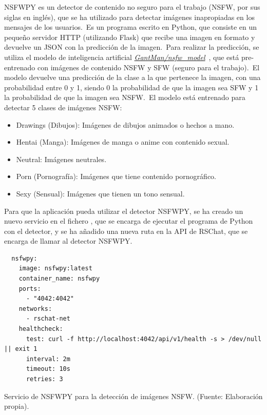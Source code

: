 NSFWPY es un detector de contenido no seguro para el trabajo (NSFW, por sus siglas en inglés), que se ha utilizado para
detectar imágenes inapropiadas en los mensajes de los usuarios.\ Es un programa escrito en Python, que consiste en
un pequeño servidor HTTP (utilizando Flask) que recibe una imagen en formato  y devuelve un JSON con
la predicción de la imagen.\ Para realizar la predicción, se utiliza el modelo de inteligencia artificial
\href{https://github.com/GantMan/nsfw_model}{\textit{GantMan/nsfw\_model}}~\cite{nsfw-model-repo},
que está pre-entrenado con imágenes de contenido NSFW y SFW (seguro para el trabajo).\ El modelo devuelve una
predicción de la clase a la que pertenece la imagen, con una probabilidad entre 0 y 1, siendo 0 la probabilidad de
que la imagen sea SFW y 1 la probabilidad de que la imagen sea NSFW\@.\ El modelo está entrenado para detectar 5
clases de imágenes NSFW:
\begin{itemize}
	\item Drawings (Dibujos): Imágenes de dibujos animados o hechos a mano.
	\item Hentai (Manga): Imágenes de manga o anime con contenido sexual.
	\item Neutral: Imágenes neutrales.
	\item Porn (Pornografía): Imágenes que tiene contenido pornográfico.
	\item Sexy (Sensual): Imágenes que tienen un tono sensual.
\end{itemize}

Para que la aplicación pueda utilizar el detector NSFWPY, se ha creado un nuevo servicio en el fichero
, que se encarga de ejecutar el programa de Python con el detector, y se ha añadido
una nueva ruta en la API de RSChat, que se encarga de llamar al detector NSFWPY\@.

\begin{codeBlock}
	\begin{verbatim}
  nsfwpy:
    image: nsfwpy:latest
    container_name: nsfwpy
    ports:
      - "4042:4042"
    networks:
      - rschat-net
    healthcheck:
      test: curl -f http://localhost:4042/api/v1/health -s > /dev/null || exit 1
      interval: 2m
      timeout: 10s
      retries: 3
	\end{verbatim}
	\caption{Servicio de NSFWPY para la detección de imágenes NSFW. (Fuente: Elaboración propia).}
	\label{cod:nsfw-docker-compose}
\end{codeBlock}

